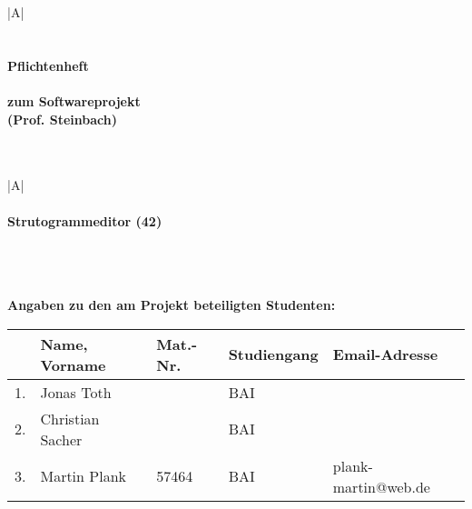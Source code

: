 \documentclass[a4paper,10pt]{report}
\begin{document}
\begin{titlepage}

\begin{center}
\begin{tabular}{|A|}
\hline
\\
\\
\\
\bfseries \Huge \quad \quad \quad  Pflichtenheft   \quad \quad \quad
\\
\\
\Large zum Softwareprojekt\\
\Large (Prof. Steinbach)\\
\\
\\
\hline
\end{tabular}
\end{center}

\vspace{3,5mm}

\begin{center}
\begin{tabular}{|A|}
\hline
\\
\\
\bfseries \Large \quad \quad \quad Strutogrammeditor (42) \quad \quad \quad 
\\
\\
\\
\\
\hline
\end{tabular}
\end{center}

\vspace{9mm}

\bfseries \large Angaben zu den am Projekt beteiligten Studenten:

\begin{center}
\begin{tabular}{|c|l|l|l|l|}
\hline
\rowcolor{Gray}\normalsize &\normalsize Name, Vorname &\normalsize Mat.-Nr. &\normalsize Studiengang &\normalsize Email-Adresse \\
\hline
\rowcolor{lightGray}\normalsize 1. &Jonas Toth & &BAI & \\
\hline
\rowcolor{Gray}\normalsize 2. &Christian Sacher & &BAI & \\
\hline
\rowcolor{lightGray}\normalsize 3. &Martin Plank&57464 &BAI &plank-martin@web.de  \\
\hline


\end{tabular}
\end{center}
\end{titlepage}
\end{document}
